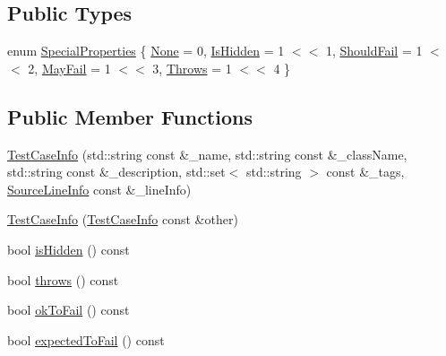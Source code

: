 \subsection*{Public Types}
\begin{DoxyCompactItemize}
\item 
enum \hyperlink{struct_catch_1_1_test_case_info_a39b232f74b4a7a6f2183b96759027eac}{Special\+Properties} \{ \newline
\hyperlink{struct_catch_1_1_test_case_info_a39b232f74b4a7a6f2183b96759027eacaf94e9de5f8ec1e53b1aa761ec564b31a}{None} = 0, 
\hyperlink{struct_catch_1_1_test_case_info_a39b232f74b4a7a6f2183b96759027eacaeda53906c14c3973e0980900c132b8f7}{Is\+Hidden} = 1 $<$$<$ 1, 
\hyperlink{struct_catch_1_1_test_case_info_a39b232f74b4a7a6f2183b96759027eacaf9002285bccfc343935958f3953f4c01}{Should\+Fail} = 1 $<$$<$ 2, 
\hyperlink{struct_catch_1_1_test_case_info_a39b232f74b4a7a6f2183b96759027eacadf1873d3271121cb9f52d7df45b416ca}{May\+Fail} = 1 $<$$<$ 3, 
\newline
\hyperlink{struct_catch_1_1_test_case_info_a39b232f74b4a7a6f2183b96759027eaca4704adf89ed7f7ad653d08f99813a974}{Throws} = 1 $<$$<$ 4
 \}
\end{DoxyCompactItemize}
\subsection*{Public Member Functions}
\begin{DoxyCompactItemize}
\item 
\hyperlink{struct_catch_1_1_test_case_info_a35ec65315e0d1f178491b5a59f3f3123}{Test\+Case\+Info} (std\+::string const \&\+\_\+name, std\+::string const \&\+\_\+class\+Name, std\+::string const \&\+\_\+description, std\+::set$<$ std\+::string $>$ const \&\+\_\+tags, \hyperlink{struct_catch_1_1_source_line_info}{Source\+Line\+Info} const \&\+\_\+line\+Info)
\item 
\hyperlink{struct_catch_1_1_test_case_info_ac338adb4e38f4bf3977fb45b2b1fe447}{Test\+Case\+Info} (\hyperlink{struct_catch_1_1_test_case_info}{Test\+Case\+Info} const \&other)
\item 
bool \hyperlink{struct_catch_1_1_test_case_info_a934b1a0952700743e99d62ec1731a2e2}{is\+Hidden} () const
\item 
bool \hyperlink{struct_catch_1_1_test_case_info_afc70d4379a2070cc22b693ffe3932c1a}{throws} () const
\item 
bool \hyperlink{struct_catch_1_1_test_case_info_a5f37291295e3a6de2dd85324c941edaf}{ok\+To\+Fail} () const
\item 
bool \hyperlink{struct_catch_1_1_test_case_info_abe33d81233230cdae8afa714688e905b}{expected\+To\+Fail} () const
\end{DoxyCompactItemize}
